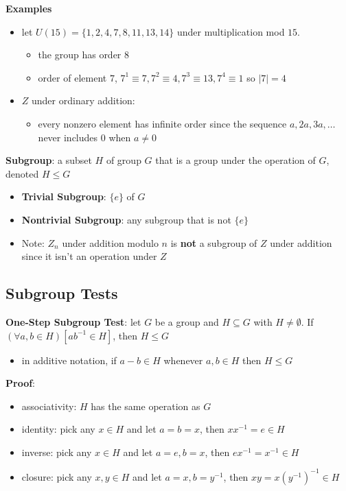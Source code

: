 \documentclass{article}
\begin{document}
  \textbf{Examples}
  \begin{itemize}
    \item let $U(15) = \{1, 2, 4,7, 8, 11, 13, 14\}$ under multiplication mod $15$.
      \begin{itemize}
        \item the group has order $8$
        \item order of element $7$, $7^1 \equiv 7, 7^2 \equiv 4, 7^3 \equiv 13, 7^4 \equiv 1$ so $|7| = 4$
      \end{itemize}
    \item $Z$ under ordinary addition:
      \begin{itemize}
        \item every nonzero element has infinite order since the sequence $a, 2a, 3a, \ldots$ never includes $0$ when $a \neq 0$
      \end{itemize}
  \end{itemize}

  \textbf{Subgroup}: a subset $H$ of group $G$ that is a group under the operation of $G$, denoted $H \leq G$
  \begin{itemize}
    \item \textbf{Trivial Subgroup}: $\{e\}$ of $G$
    \item \textbf{Nontrivial Subgroup}: any subgroup that is not $\{e\}$
    \item Note: $Z_n$ under addition modulo $n$ is \textbf{not} a subgroup of $Z$ under addition since it isn't an operation under $Z$
  \end{itemize}
  \subsection{Subgroup Tests}
  \textbf{One-Step Subgroup Test}: let $G$ be a group and $H \subseteq G$ with $H \neq \emptyset$. If $(\forall a,b \in H)$$[ab^{-1} \in H]$, then $H \leq G$
  \begin{itemize}
    \item in additive notation, if $a-b \in H$ whenever $a,b \in H$ then $H \leq G$
  \end{itemize}
  \textbf{Proof}: 
  \begin{itemize}
    \item associativity: $H$ has the same operation as $G$
    \item identity: pick any $x \in H$ and let $a = b = x$, then $xx^{-1} = e \in H$
    \item inverse: pick any $x \in H$ and let $a = e, b = x$, then $ex^{-1} = x^{-1} \in H$
    \item closure: pick any $x, y \in H$ and let $a = x, b = y^{-1}$, then $xy = x(y^{-1})^{-1} \in H$
  \end{itemize}
  \bigskip
\end{document}
